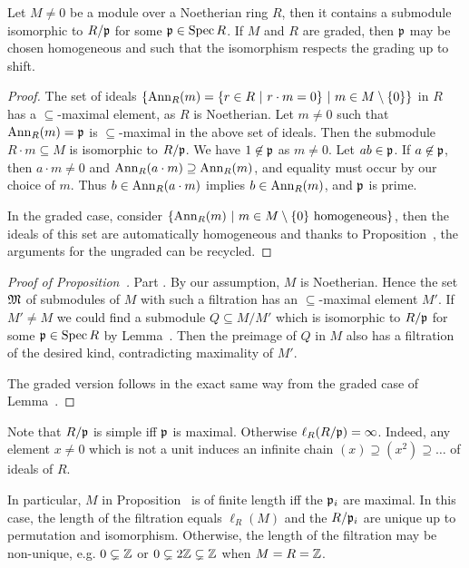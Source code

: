 \documentclass[a4paper,parskip=half,numbers=enddot, DIV=12]{scrreprt}
\begin{document}
\begin{lem}
    Let $M\neq0$ be a module over a Noetherian ring $R$,  then it contains a submodule isomorphic to $R/\mathfrak{p}$ for some $\mathfrak{p}\in \operatorname{Spec} R$. If $M$ and $R$ are graded, then $\mathfrak{p}$ may be chosen homogeneous and such that the isomorphism respects the grading up to shift.
\end{lem}
\begin{proof}
    The set of ideals $\left\{\operatorname{Ann}_R(m) = \left\{r\in R\ \middle|\  r\cdot m = 0\right\} \ \middle|\  m\in M\setminus \{0\}\right\}$ in $R$ has a $\subseteq$-maximal element, as $R$ is Noetherian. Let $m\neq 0$ such that $\operatorname{Ann}_R(m) = \mathfrak{p}$ is $\subseteq$-maximal in the above set of ideals. Then the submodule $R\cdot m \subseteq M$ is isomorphic to $R/\mathfrak{p}$. We have $1\not\in \mathfrak{p}$ as $m\neq 0$. Let $ab\in \mathfrak{p}$. If $a\not\in\mathfrak{p}$, then $a\cdot m \neq 0$ and $\operatorname{Ann}_R(a\cdot m)\supseteq \operatorname{Ann}_R(m)$, and equality must occur by our choice of $m$. Thus $b\in \operatorname{Ann}_R(a\cdot m)$ implies $b\in \operatorname{Ann}_R(m)$, and $\mathfrak{p}$ is prime.
    
    In the graded case, consider $\left\{\operatorname{Ann}_R(m)\ \middle|\  m\in M\setminus\{0\}\text{ homogeneous}\right\}$, then the ideals of this set are automatically homogeneous and thanks to Proposition~, the arguments for the ungraded can be recycled.
\end{proof}
\begin{proof}[Proof of Proposition~]
    Part . By our assumption, $M$ is Noetherian. Hence the set $\mathfrak{M}$ of submodules of $M$ with such a filtration has an $\subseteq$-maximal element $M'$. If $M'\neq M$ we could find a submodule $Q\subseteq M/M'$ which is isomorphic to $R/\mathfrak{p}$ for some $\mathfrak{p}\in \operatorname{Spec} R$ by Lemma~. Then the preimage of $Q$ in $M$ also has a filtration of the desired kind, contradicting maximality of $M'$.
    
    The graded version  follows in the exact same way from the graded case of Lemma~.
\end{proof}
\begin{rem*}
    \begin{alphanumerate}
    \item 
        Note that $R/\mathfrak{p}$ is simple iff $\mathfrak{p}$ is maximal. Otherwise $\ell_R(R/\mathfrak{p}) = \infty$. Indeed, any element $x\not=0$ which is not a unit induces an infinite chain $(x)\supseteq(x^2)\supseteq\ldots$ of ideals of $R$.
    \item 
        In particular, $M$ in Proposition~ is of finite length iff the $\mathfrak{p}_i$ are maximal. In this case, the length of the filtration equals $\ell_R(M)$ and the $R/\mathfrak{p}_i$ are unique up to permutation and isomorphism. Otherwise, the length of the filtration may be non-unique, e.g. $0\subsetneq \mathbb{Z}$ or $0\subsetneq 2\mathbb{Z} \subsetneq \mathbb{Z}$ when $M=R=\mathbb{Z}$.
    \end{alphanumerate}
\end{rem*}
\end{document}

